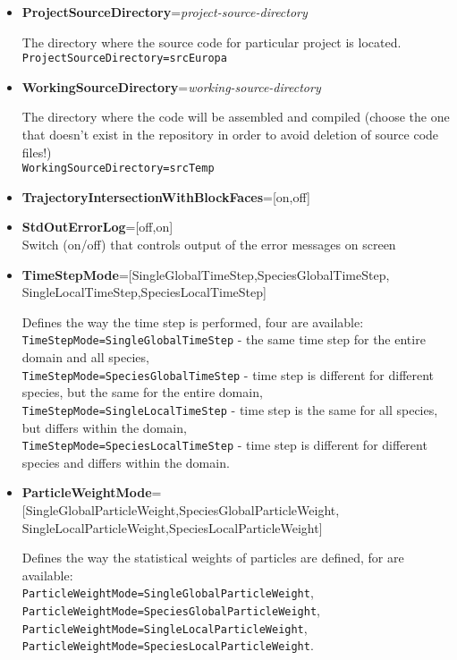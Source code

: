\begin{itemize}
\item {\bf ProjectSourceDirectory}={\it project-source-directory}

The directory where the source code for particular project is located.\\
{\tt ProjectSourceDirectory=srcEuropa}

\item {\bf WorkingSourceDirectory}={\it working-source-directory}

The directory where the code will be assembled and compiled
(choose the one that doesn't exist in the repository in order
to avoid deletion of source code files!)\\
{\tt WorkingSourceDirectory=srcTemp}

\item {\bf TrajectoryIntersectionWithBlockFaces}=[on,off]

\item {\bf StdOutErrorLog}=[off,on] \\ Switch (on/off) that controls output of the error messages on screen

\item {\bf TimeStepMode}=[SingleGlobalTimeStep,SpeciesGlobalTimeStep, \\ SingleLocalTimeStep,SpeciesLocalTimeStep]

Defines the way the time step is performed, four are available:
\\{\tt TimeStepMode=SingleGlobalTimeStep} - the same time step
for the entire domain and all species,
\\{\tt TimeStepMode=SpeciesGlobalTimeStep} - time step is different for
different species, but the same for the entire domain,
\\{\tt TimeStepMode=SingleLocalTimeStep} - time step is the same for all species, 
but differs within the domain,
\\{\tt TimeStepMode=SpeciesLocalTimeStep} - time step is different for different
species and differs within the domain.

\item {\bf ParticleWeightMode}=[SingleGlobalParticleWeight,SpeciesGlobalParticleWeight, \\ SingleLocalParticleWeight,SpeciesLocalParticleWeight]

Defines the way the statistical weights of particles are defined, for are available:
\\{\tt  ParticleWeightMode=SingleGlobalParticleWeight},
\\{\tt  ParticleWeightMode=SpeciesGlobalParticleWeight},
\\{\tt  ParticleWeightMode=SingleLocalParticleWeight},
\\{\tt  ParticleWeightMode=SpeciesLocalParticleWeight}.


\end{itemize}
